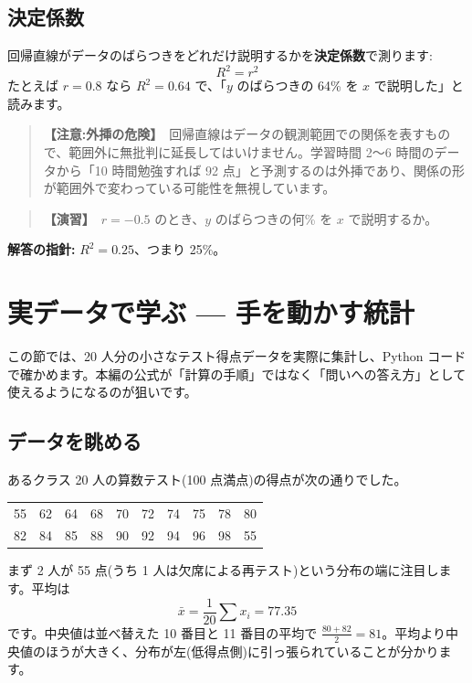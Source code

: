 \documentclass{article}
\begin{document}
\subsection{決定係数}

回帰直線がデータのばらつきをどれだけ説明するかを\textbf{決定係数}で測ります:
\[ R^2 = r^2 \]
たとえば \(r = 0.8\) なら \(R^2 = 0.64\) で、「\(y\) のばらつきの 64\% を \(x\) で説明した」と読みます。

\begin{quote}
\textbf{【注意:外挿の危険】}\ 回帰直線はデータの観測範囲での関係を表すもので、範囲外に無批判に延長してはいけません。学習時間 2〜6 時間のデータから「10 時間勉強すれば 92 点」と予測するのは外挿であり、関係の形が範囲外で変わっている可能性を無視しています。
\end{quote}

\begin{quote}
\textbf{【演習】}\ \(r = -0.5\) のとき、\(y\) のばらつきの何\% を \(x\) で説明するか。
\end{quote}

\textbf{解答の指針:} \(R^2 = 0.25\)、つまり 25\%。

\section{実データで学ぶ — 手を動かす統計}

この節では、20 人分の小さなテスト得点データを実際に集計し、Python コードで確かめます。本編の公式が「計算の手順」ではなく「問いへの答え方」として使えるようになるのが狙いです。

\subsection{データを眺める}

あるクラス 20 人の算数テスト(100 点満点)の得点が次の通りでした。

\begin{center}
\begin{tabular}{|cccccccccc|}
\hline
55 & 62 & 64 & 68 & 70 & 72 & 74 & 75 & 78 & 80 \\
82 & 84 & 85 & 88 & 90 & 92 & 94 & 96 & 98 & 55 \\
\hline
\end{tabular}
\end{center}

まず 2 人が 55 点(うち 1 人は欠席による再テスト)という分布の端に注目します。平均は
\[ \bar{x} = \frac{1}{20} \sum x_i = 77.35 \]
です。中央値は並べ替えた 10 番目と 11 番目の平均で \(\frac{80 + 82}{2} = 81\)。平均より中央値のほうが大きく、分布が左(低得点側)に引っ張られていることが分かります。
\end{document}
